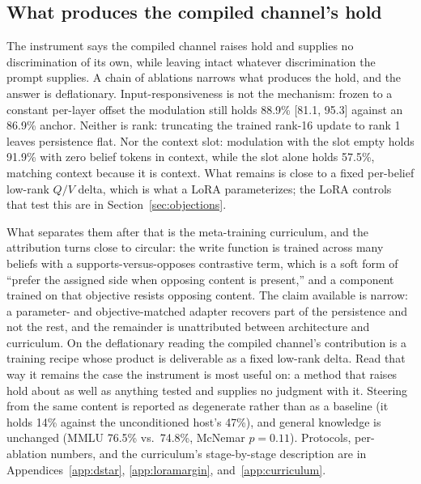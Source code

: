 \iflongversion
\subsection{What produces the compiled channel's hold}
\label{sec:isolation}
\label{sec:isolation-steering}\label{sec:isolation-frozen}%
\label{sec:isolation-lora}\label{sec:isolation-further}%
\label{sec:isolation-rank}\label{sec:isolation-amplitude}%
\label{sec:isolation-mmlu}

The instrument says the compiled channel raises hold and supplies no discrimination of its
own, while leaving intact whatever discrimination the prompt supplies. A chain of ablations narrows
what produces the hold, and the answer is deflationary. Input-responsiveness is not the
mechanism: frozen to a constant per-layer offset the modulation still holds 88.9\% [81.1, 95.3]
against an 86.9\% anchor. Neither is rank: truncating the trained rank-16 update to rank 1
leaves persistence flat. Nor the context slot: modulation with the slot empty holds 91.9\% with
zero belief tokens in context, while the slot alone holds 57.5\%, matching context because it
is context. What remains is close to a fixed per-belief low-rank \(Q/V\) delta, which is what a LoRA
parameterizes; the LoRA controls that test this are in Section~\ref{sec:objections}.

What separates them after that is the meta-training curriculum, and the attribution turns close
to circular: the write function is trained across many beliefs with a supports-versus-opposes
contrastive term, which is a soft form of ``prefer the assigned side when opposing content is
present,'' and a component trained on that objective resists opposing content. The claim
available is narrow: a parameter- and objective-matched adapter recovers part of the
persistence and not the rest, and the remainder is unattributed between architecture and
curriculum. On the deflationary reading the compiled channel's contribution is a training
recipe whose product is deliverable as a fixed low-rank delta. Read that way it remains the case the instrument is most useful on: a method that raises
hold about as well as anything tested and supplies no judgment with it. Steering from the same content is reported as degenerate rather
than as a baseline (it holds 14\% against the unconditioned host's 47\%), and general knowledge
is unchanged (MMLU 76.5\% vs.\ 74.8\%, McNemar \(p=0.11\)). Protocols, per-ablation numbers,
and the curriculum's stage-by-stage description are in
Appendices~\ref{app:dstar}, \ref{app:loramargin}, and~\ref{app:curriculum}.
\fi
